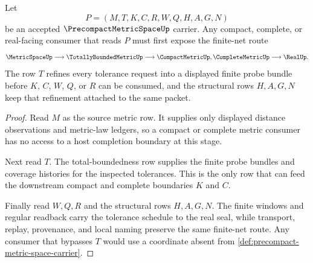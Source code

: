 \begin{theorem}
\label{thm:precompact-metric-space-finite-net-refinement}
Let
$$
P=(M,T,K,C,R,W,Q,H,A,G,N)
$$
be an accepted $\PrecompactMetricSpaceUp$ carrier. Any compact, complete, or real-facing consumer that reads $P$ must first expose the finite-net route
$$
\MetricSpaceUp \longrightarrow \TotallyBoundedMetricUp \longrightarrow \CompactMetricUp,\CompleteMetricUp \longrightarrow \RealUp .
$$
The row $T$ refines every tolerance request into a displayed finite probe bundle before $K$, $C$, $W$, $Q$, or $R$ can be consumed, and the structural rows $H,A,G,N$ keep that refinement attached to the same packet.
\end{theorem}
\begin{proof}
Read $M$ as the source metric row. It supplies only displayed distance observations and metric-law ledgers, so a compact or complete metric consumer has no access to a host completion boundary at this stage.

Next read $T$. The total-boundedness row supplies the finite probe bundles and coverage histories for the inspected tolerances. This is the only row that can feed the downstream compact and complete boundaries $K$ and $C$.

Finally read $W,Q,R$ and the structural rows $H,A,G,N$. The finite windows and regular readback carry the tolerance schedule to the real seal, while transport, replay, provenance, and local naming preserve the same finite-net route. Any consumer that bypasses $T$ would use a coordinate absent from \autoref{def:precompact-metric-space-carrier}.
\end{proof}


